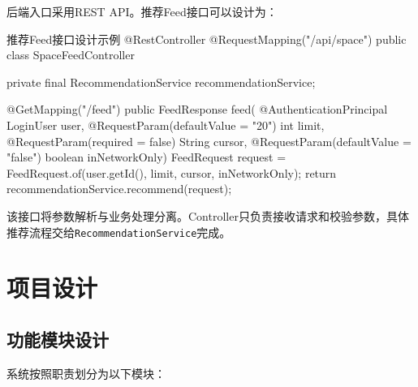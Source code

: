 后端入口采用REST API。推荐Feed接口可以设计为：

\begin{codeblock}[Java]{推荐Feed接口设计示例}
  @RestController
  @RequestMapping("/api/space")
  public class SpaceFeedController {
      private final RecommendationService recommendationService;

      @GetMapping("/feed")
      public FeedResponse feed(
      @AuthenticationPrincipal LoginUser user,
      @RequestParam(defaultValue = "20") int limit,
      @RequestParam(required = false) String cursor,
      @RequestParam(defaultValue = "false") boolean inNetworkOnly) {
          FeedRequest request = FeedRequest.of(user.getId(), limit, cursor, inNetworkOnly);
          return recommendationService.recommend(request);
        }
    }
\end{codeblock}

该接口将参数解析与业务处理分离。Controller只负责接收请求和校验参数，具体推荐流程交给\texttt{RecommendationService}完成。

\section{项目设计}

\subsection{功能模块设计}

系统按照职责划分为以下模块：

